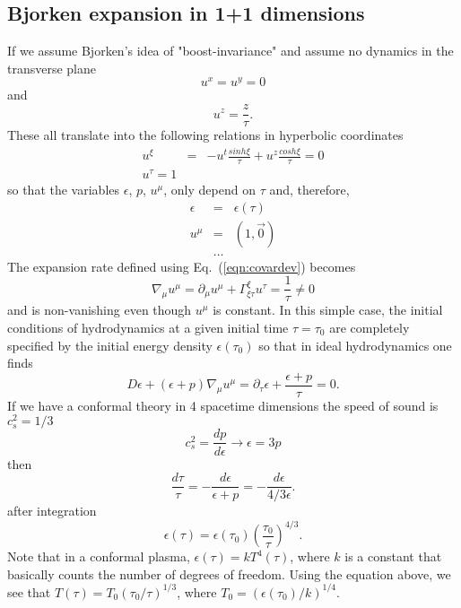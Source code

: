 \documentclass[aps,article]{revtex4}
\begin{document}
\subsection{Bjorken expansion in 1+1 dimensions}
If we assume Bjorken's idea of "boost-invariance" and assume no dynamics in the transverse plane 
\begin{equation}
u^x=u^y=0
\end{equation}
and
\begin{equation}
u^z=\frac{z}{\tau}.
\end{equation}
These all translate into the following relations in hyperbolic coordinates 
\begin{eqnarray}
u^{\xi}&=&-u^t\frac{sinh \xi}{\tau}+u^z\frac{cosh \xi}{\tau}=0 \nonumber \\ 
u^{\tau}=1
\end{eqnarray}
so that the variables $\epsilon$, $p$, $u^{\mu}$, only depend on $\tau$ and, therefore,
\begin{eqnarray}
\epsilon&=&\epsilon\left(\tau\right)\nonumber\\
u^{\mu}&=&\left(1,\vec{0}\right)\nonumber\\
&\dots&
\end{eqnarray}
The expansion rate defined using Eq.\ (\ref{eqn:covardev}) becomes
\begin{equation}\label{eqn:bjrokencovardev}
\nabla_{\mu}u^{\mu}=\partial_{\mu}u^{\mu}+\Gamma^{\xi}_{\xi\tau}u^{\tau}=\frac{1}{\tau}\neq 0
\end{equation}
and is non-vanishing even though $u^{\mu}$ is constant. In this simple case,  the initial conditions of hydrodynamics at a given initial time $\tau=\tau_0$ are completely specified by the initial energy density $\epsilon(\tau_0)$ so that in ideal hydrodynamics one finds
\begin{equation}
D\epsilon+\left(\epsilon+p\right)\nabla_{\mu}u^{\mu}=\partial_{\tau}\epsilon+\frac{\epsilon+p}{\tau}=0.
\end{equation}
If we have a conformal theory in 4 spacetime dimensions the speed of sound is $c_s^{2}=1/3$
\begin{equation}
c_s^2=\frac{dp}{d\epsilon}\rightarrow \epsilon=3p
\end{equation}
then 
\begin{equation}
\frac{d\tau}{\tau}=-\frac{d\epsilon}{\epsilon+p}=-\frac{d\epsilon}{4/3\epsilon}.  
\end{equation}
after integration
\begin{equation}
\epsilon(\tau)=\epsilon(\tau_0)\left(\frac{\tau_0}{\tau}\right)^{4/3}.
\end{equation}
Note that in a conformal plasma, $\epsilon(\tau)=k T^4(\tau)$, where $k$ is a constant that basically counts the number of degrees of freedom. Using the equation above, we see that $T(\tau)=T_0 (\tau_0/\tau)^{1/3}$, where $T_0 = (\epsilon(\tau_0)/k)^{1/4}$.
\end{document}
